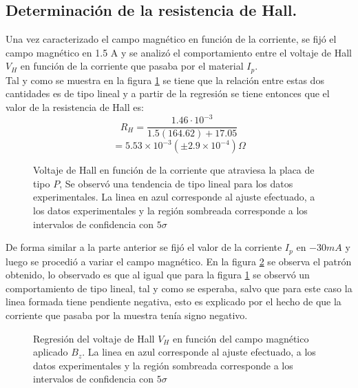\documentclass[%
 reprint,
 amsmath,amssymb,
 aps,
]{revtex4-1}
\begin{document}
\subsection{Determinación de la resistencia de Hall.}
Una vez caracterizado el campo magnético en función de la corriente, se fijó el campo magnético en 1.5 A y se analizó el comportamiento entre el voltaje de Hall $V_H$ en función de la corriente que pasaba por el material $I_p$.\\
Tal y como se muestra en la figura \ref{V_H_vs_I_p} se tiene que la relación entre estas dos cantidades es de tipo lineal y a partir de la regresión se tiene entonces que el valor de la resistencia de Hall es:
\[R_H=\frac{1.46\cdot 10^{-3}}{1.5(164.62)+17.05}\]
\[=5.53\times 10^{-3} (\pm 2.9\times 10^{-4}) \Omega\]
\begin{figure}[h!]
\caption{\label{V_H_vs_I_p}Voltaje de Hall en función de la corriente que atraviesa la placa de tipo $P$, Se observó una tendencia de tipo lineal para los datos experimentales. La linea en azul corresponde al ajuste efectuado, a los datos experimentales y la región sombreada corresponde a los intervalos de confidencia con $5\sigma$}
\end{figure}

 De forma similar a la parte anterior se fijó el valor de la corriente $I_p$ en $-30 mA$ y luego se procedió a variar el campo magnético. En la figura \ref{V_H_vs_campo}  se observa el patrón obtenido, lo observado es que al igual que para la figura \ref{V_H_vs_I_p} se observó un comportamiento de tipo lineal, tal y como se esperaba, salvo que para este caso la linea formada tiene pendiente negativa, esto es explicado por el hecho de que la corriente que pasaba por la muestra tenía signo negativo.
\begin{figure}[h!]
\caption{\label{V_H_vs_campo}Regresión del voltaje de Hall $V_H$ en función del campo magnético aplicado $B_z$.  La linea en azul corresponde al ajuste efectuado, a los datos experimentales y la región sombreada corresponde a los intervalos de confidencia con $5\sigma$}
\end{figure}
\end{document}
